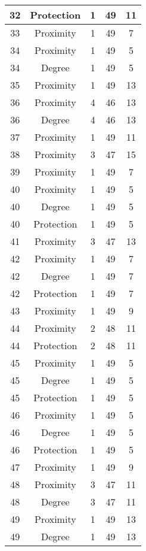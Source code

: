 \documentclass[results.tex]{subfiles}
\begin{document}
\begin{center}
\begin{tabular}{| c || c | c | c | c |}
    \hline
    32 & Protection & 1 & 49 & 11 \\ 
    \hline
    33 & Proximity & 1 & 49 & 7 \\ 
    \hline
    34 & Proximity & 1 & 49 & 5 \\ 
    \hline
    34 & Degree & 1 & 49 & 5 \\ 
    \hline
    35 & Proximity & 1 & 49 & 13 \\ 
    \hline
    36 & Proximity & 4 & 46 & 13 \\ 
    \hline
    36 & Degree & 4 & 46 & 13 \\ 
    \hline
    37 & Proximity & 1 & 49 & 11 \\ 
    \hline
    38 & Proximity & 3 & 47 & 15 \\ 
    \hline
    39 & Proximity & 1 & 49 & 7 \\ 
    \hline
    40 & Proximity & 1 & 49 & 5 \\ 
    \hline
    40 & Degree & 1 & 49 & 5 \\ 
    \hline
    40 & Protection & 1 & 49 & 5 \\ 
    \hline
    41 & Proximity & 3 & 47 & 13 \\ 
    \hline
    42 & Proximity & 1 & 49 & 7 \\ 
    \hline
    42 & Degree & 1 & 49 & 7 \\ 
    \hline
    42 & Protection & 1 & 49 & 7 \\ 
    \hline
    43 & Proximity & 1 & 49 & 9 \\ 
    \hline
    44 & Proximity & 2 & 48 & 11 \\ 
    \hline
    44 & Protection & 2 & 48 & 11 \\ 
    \hline
    45 & Proximity & 1 & 49 & 5 \\ 
    \hline
    45 & Degree & 1 & 49 & 5 \\ 
    \hline
    45 & Protection & 1 & 49 & 5 \\ 
    \hline
    46 & Proximity & 1 & 49 & 5 \\ 
    \hline
    46 & Degree & 1 & 49 & 5 \\ 
    \hline
    46 & Protection & 1 & 49 & 5 \\ 
    \hline
    47 & Proximity & 1 & 49 & 9 \\ 
    \hline
    48 & Proximity & 3 & 47 & 11 \\ 
    \hline
    48 & Degree & 3 & 47 & 11 \\ 
    \hline
    49 & Proximity & 1 & 49 & 13 \\ 
    \hline
    49 & Degree & 1 & 49 & 13 \\ 
    \hline   \end{tabular}
\end{center}
\end{document}
